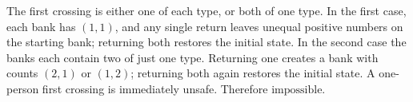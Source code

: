 The first crossing is either one of each type, or both of one type. In the first case, each bank has $(1,1)$, and any single return leaves unequal positive numbers on the starting bank; returning both restores the initial state. In the second case the banks each contain two of just one type. Returning one creates a bank with counts $(2,1)$ or $(1,2)$; returning both again restores the initial state. A one-person first crossing is immediately unsafe. Therefore $\boxed{\text{impossible}}$.
